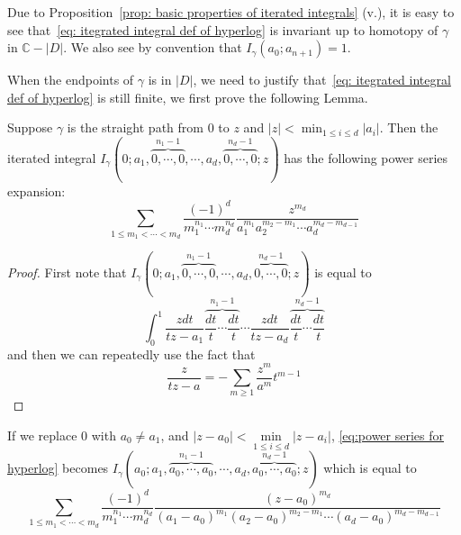 \begin{remark}
Due to Proposition~\ref{prop: basic properties of iterated integrals} (v.), it is easy to see that~\eqref{eq: itegrated integral def of hyperlog} is invariant up to homotopy of $\gamma$ in $\mathbb C-|D|$. We also see by convention that $I_\gamma(a_0;a_{n+1})=1$.
\end{remark}

When the endpoints of $\gamma$ is in $|D|$, we need to justify that~\eqref{eq: itegrated integral def of hyperlog} is still finite, we first prove the following Lemma.

\begin{lemma}\label{lem: power series for hyperlog}\cite{FrancisBrown_SingleValuedHyperlogarithmsAndUnipotentDifferentialEquations}
Suppose $\gamma$ is the straight path from 0 to $z$ and $|z|<\displaystyle\min_{1\leq i\leq d}|a_i|$. Then the iterated integral $I_\gamma(0;a_1,\overbrace{0,\cdots,0}^{n_1-1},\cdots,a_d,\overbrace{0,\cdots,0}^{n_d-1};z)$ has the following power series expansion:
\begin{equation}\label{eq:power series for hyperlog}
\sum_{1\leq m_1<\cdots<m_d}\frac{(-1)^d}{m_1^{n_1}\cdots m_d^{n_d}}\frac{z^{m_d}}{a_1^{m_1}a_2^{m_2-m_1}\cdots a_d^{m_d-m_{d-1}}}
\end{equation}
\end{lemma}

\begin{proof}
First note that $I_\gamma(0;a_1,\overbrace{0,\cdots,0}^{n_1-1},\cdots,a_d,\overbrace{0,\cdots,0}^{n_d-1};z)$ is equal to
\[
\int_0^1\frac{zdt}{tz-a_1}\overbrace{\frac{dt}{t}\cdots\frac{dt}{t}}^{n_1-1}\cdots\frac{zdt}{tz-a_d}\overbrace{\frac{dt}{t}\cdots\frac{dt}{t}}^{n_d-1}
\]
and then we can repeatedly use the fact that
\[
\frac{z}{tz-a}=-\sum_{m\geq1}\frac{z^{m}}{a^{m}}t^{m-1}
\]
\end{proof}

\begin{corollary}
If we replace 0 with $a_0\neq a_1$, and $|z-a_0|<\min\limits_{1\leq i\leq d}|z-a_i|$, \eqref{eq:power series for hyperlog} becomes $I_\gamma(a_0;a_1,\overbrace{a_0,\cdots,a_0}^{n_1-1},\cdots,a_d,\overbrace{a_0,\cdots,a_0}^{n_d-1};z)$ which is equal to
\begin{equation}\label{eq:general power series for hyperlog}
\sum_{1\leq m_1<\cdots<m_d}\frac{(-1)^d}{m_1^{n_1}\cdots m_d^{n_d}}\frac{(z-a_0)^{m_d}}{(a_1-a_0)^{m_1}(a_2-a_0)^{m_2-m_1}\cdots (a_d-a_0)^{m_d-m_{d-1}}}
\end{equation}
\end{corollary}

